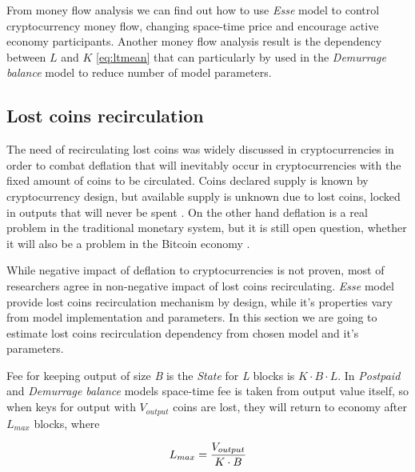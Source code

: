 \documentclass[]{article}   %
\newcommand{\esse}{\textit{Esse}}
\newcommand{\state}{\textit{State}}
\begin{document}
From money flow analysis we can find out how to use \esse{} model to control cryptocurrency money flow, changing space-time price and encourage active economy participants. Another money flow analysis result is the dependency between $L$ and $K$ \ref{eq:ltmean} that can particularly by used in the \textit{Demurrage balance} model to reduce number of model parameters.


\subsection{Lost coins recirculation}
\label{sec:re}

The need of recirculating lost coins was widely discussed in cryptocurrencies \cite{gjermundrod2014recirculating, gjermundrod2016going} in order to combat deflation that will inevitably occur in cryptocurrencies with the fixed amount of coins to be circulated. Coins declared supply is known by cryptocurrency design, but available supply is unknown due to lost coins, locked in outputs that will never be spent \cite{ron2013quantitative}. On the other hand deflation is a real problem in the traditional monetary system, but it is still open question, whether it will also be a problem in the Bitcoin economy \cite{bitcoinDeflationarySpiral, barber2012bitter}.

While negative impact of deflation to cryptocurrencies is not proven, most of researchers agree in non-negative impact of lost coins recirculating. \esse{} model provide lost coins recirculation mechanism by design, while it's properties vary from model implementation and parameters. In this section we are going to estimate lost coins recirculation dependency from chosen model and it's parameters.

Fee for keeping output of size \textit{B} is the \state{} for \textit{L} blocks is ${K \cdot B \cdot L}$. In \textit{Postpaid} and \textit{Demurrage balance} models space-time fee is taken from output value itself, so when keys for output with \textit{$V_{output}$} coins are lost, they will return to economy after \textit{$L_{max}$} blocks, where

\begin{equation}
{L_{max} = {V_{output} \over K \cdot B}}
\end{equation}
\end{document}
